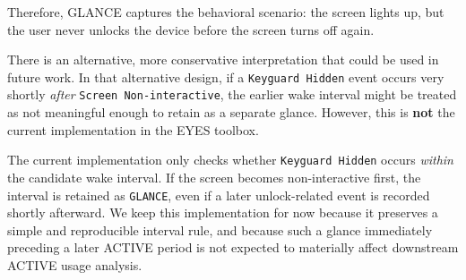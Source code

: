 \documentclass[11pt]{article}
\begin{document}
Therefore, GLANCE captures the behavioral scenario: the screen lights up, but the user never unlocks the device before the screen turns off again.

There is an alternative, more conservative interpretation that could be used in future work. In that alternative design, if a \texttt{Keyguard Hidden} event occurs very shortly \emph{after} \texttt{Screen Non-interactive}, the earlier wake interval might be treated as not meaningful enough to retain as a separate glance. However, this is \textbf{not} the current implementation in the EYES toolbox.

The current implementation only checks whether \texttt{Keyguard Hidden} occurs \emph{within} the candidate wake interval. If the screen becomes non-interactive first, the interval is retained as \texttt{GLANCE}, even if a later unlock-related event is recorded shortly afterward. We keep this implementation for now because it preserves a simple and reproducible interval rule, and because such a glance immediately preceding a later ACTIVE period is not expected to materially affect downstream ACTIVE usage analysis.
\end{document}
